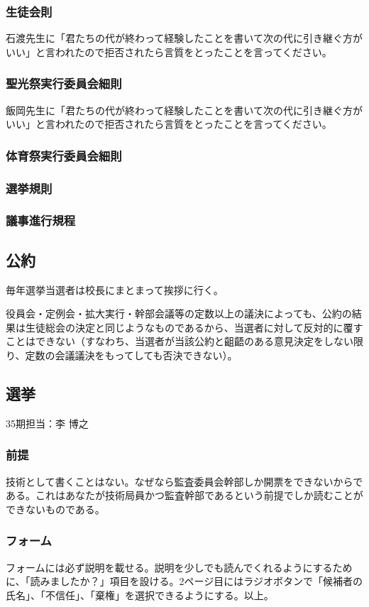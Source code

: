\documentclass[dvipdfmx,jb5]{jarticle}
\begin{document}
\subsubsection{生徒会則}
石渡先生に「君たちの代が終わって経験したことを書いて次の代に引き継ぐ方がいい」と言われたので拒否されたら言質をとったことを言ってください。
\subsubsection{聖光祭実行委員会細則}
飯岡先生に「君たちの代が終わって経験したことを書いて次の代に引き継ぐ方がいい」と言われたので拒否されたら言質をとったことを言ってください。
\subsubsection{体育祭実行委員会細則}
\subsubsection{選挙規則}
\subsubsection{議事進行規程}
\subsection{公約}
毎年選挙当選者は校長にまとまって挨拶に行く。

役員会・定例会・拡大実行・幹部会議等の定数以上の議決によっても、公約の結果は生徒総会の決定と同じようなものであるから、当選者に対して反対的に覆すことはできない（すなわち、当選者が当該公約と齟齬のある意見決定をしない限り、定数の会議議決をもってしても否決できない）。
\subsection{選挙}
35期担当：李 博之
\subsubsection{前提}
技術として書くことはない。なぜなら監査委員会幹部しか開票をできないからである。これはあなたが技術局員かつ監査幹部であるという前提でしか読むことができないものである。
\subsubsection{フォーム}
フォームには必ず説明を載せる。説明を少しでも読んでくれるようにするために、「読みましたか？」項目を設ける。2ページ目にはラジオボタンで「候補者の氏名」、「不信任」、「棄権」を選択できるようにする。以上。
\end{document}
